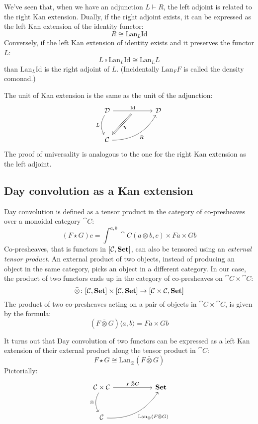 \documentclass[DaoFP]{subfiles}
\begin{document}
We've seen that, when we have an adjunction $L \vdash R$, the left adjoint is related to the right Kan extension. Dually, if the right adjoint exists, it can be expressed as the left Kan extension of the identity functor:
\[ R \cong \text{Lan}_L \text{Id} \]
Conversely, if the left Kan extension of identity exists and it preserves the functor $L$:
\[ L \circ \text{Lan}_L \text{Id} \cong \text{Lan}_L L \]
than $\text{Lan}_L \text{Id}$ is the right adjoint of $L$. (Incidentally $\text{Lan}_F F$ is called the density comonad.)

The unit of Kan extension is the same as the unit of the adjunction:
\[
 \begin{tikzcd} [row sep=1cm, column sep=1cm]
 \cat D
 \arrow[rr, "\text{Id}", "" {name=ID, below} ]
 \arrow[d, bend right, "L"']
 && \cat D
 \\
 \cat C
  \arrow[urr, bend right, "R"']
 \arrow[Rightarrow, "\eta",  from=ID]
 \end{tikzcd}
\]
The proof of universality is analogous to the one for the right Kan extension as the left adjoint.

\subsection{Day convolution as a Kan extension}

Day convolution is defined as a tensor product in the category of co-presheaves over a monoidal category $\cat C$:
\[ (F \star G) c = \int^{a, b} \cat C (a \otimes b, c) \times F a \times G b \]
Co-presheaves, that is functors in $[\mathcal{C}, \mathbf{Set}]$, can also be tensored using an \emph{external tensor product}. An external product of two objects, instead of producing an object in the same category, picks an object in a different category. In our case, the product of two functors ends up in the category of co-presheaves on $\cat C \times \cat C$:
\[ \bar{\otimes} \colon [\mathcal{C}, \mathbf{Set}] \times [\mathcal{C}, \mathbf{Set}] \to [\mathcal{C} \times \mathcal{C}, \mathbf{Set}] \]
The product of two co-presheaves acting on a pair of objects in $\cat C \times \cat C$, is given by the formula:
\[ (F \bar{\otimes} G)\langle a, b \rangle = F a \times G b \]

It turns out that Day convolution of two functors can be expressed as a left Kan extension of their external product along the tensor product in $\cat C$:
\[ F \star G \cong \text{Lan}_{\otimes} (F \bar{ \otimes } G) \]
Pictorially:
\[
 \begin{tikzcd} [row sep=1cm, column sep=1cm]
 \cat C \times \cat C
 \arrow[rr, "F \bar{\otimes} G", "" {name=ID, below} ]
 \arrow[d, bend right, "\otimes"']
 && \Set
 \\
 \cat C
  \arrow[urr, bend right, "\text{Lan}_{\otimes} (F \bar{ \otimes } G)"']
 \end{tikzcd}
\]
\end{document}
